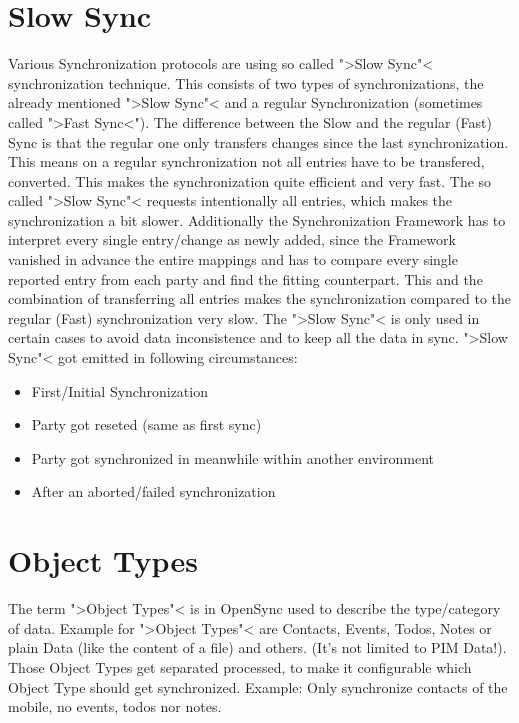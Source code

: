 \section{Slow Sync}
Various Synchronization protocols are using so called ">Slow Sync"<
synchronization technique. This consists of two types of synchronizations, the
already mentioned ">Slow Sync"< and a regular Synchronization (sometimes called
">Fast Sync<"). The difference between the Slow and the regular (Fast) Sync is 
that the regular one only transfers changes since the last synchronization. 
This means on a regular synchronization not all entries have to be transfered, 
converted. This makes the synchronization quite efficient and very fast. The
so called ">Slow Sync"< requests intentionally all entries, which makes the
synchronization a bit slower. Additionally the Synchronization Framework has to
interpret every single entry/change as newly added, since the Framework vanished
in advance the entire mappings and has to compare every single reported entry
from each party and find the fitting counterpart. This and the combination of
transferring all entries makes the synchronization compared to the regular
(Fast) synchronization very slow. The ">Slow Sync"< is only used in certain
cases to avoid data inconsistence and to keep all the data in sync. ">Slow
Sync"< got emitted in following circumstances:
\begin{itemize}
\item First/Initial Synchronization
\item Party got reseted (same as first sync)
\item Party got synchronized in meanwhile within another environment 
\item After an aborted/failed synchronization
\end{itemize}
\section{Object Types}
The term ">Object Types"< is in OpenSync used to describe the type/category of 
data. Example for ">Object Types"< are Contacts, Events, Todos, Notes or plain 
Data (like the content of a file) and others. (It's not limited to PIM Data!). 
Those Object Types get separated processed, to make it configurable which 
Object Type should get synchronized. Example: Only synchronize contacts of the 
mobile, no events, todos nor notes.
